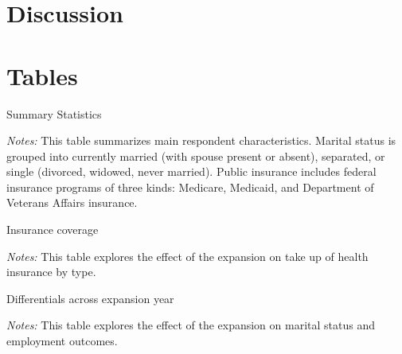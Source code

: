 \documentclass{article}
\begin{document}
\section{Discussion}


\newpage


\newpage
\section{Tables}

\newpage
\begin{table}[h!]
\begin{centering}
\singlespacing
\caption{Summary Statistics}
\label{tab:sumstat}
\end{centering}
\begin{spacing}{1}
\begin{footnotesize}

\textit{Notes:} This table summarizes main respondent characteristics. Marital status is grouped into currently married (with spouse present or absent), separated, or single (divorced, widowed, never married). Public insurance includes federal insurance programs of three kinds: Medicare, Medicaid, and Department of Veterans Affairs insurance.
\end{footnotesize}
\end{spacing}
\end{table}

\newpage
\begin{table}[h!]
\begin{centering}
\singlespacing
\caption{Insurance coverage}
\label{tab:cov}
\end{centering}
\begin{spacing}{1}
\begin{footnotesize}

\textit{Notes:} This table explores the effect of the expansion on take up of health insurance by type.
\end{footnotesize}
\end{spacing}
\end{table}

\newpage
\begin{table}[h!]
\begin{centering}
\singlespacing
\caption{Differentials across expansion year}
\label{tab:expdiff}
\end{centering}
\begin{spacing}{1}
\begin{footnotesize}

\textit{Notes:} This table explores the effect of the expansion on marital status and employment outcomes.
\end{footnotesize}
\end{spacing}
\end{table}
\end{document}
